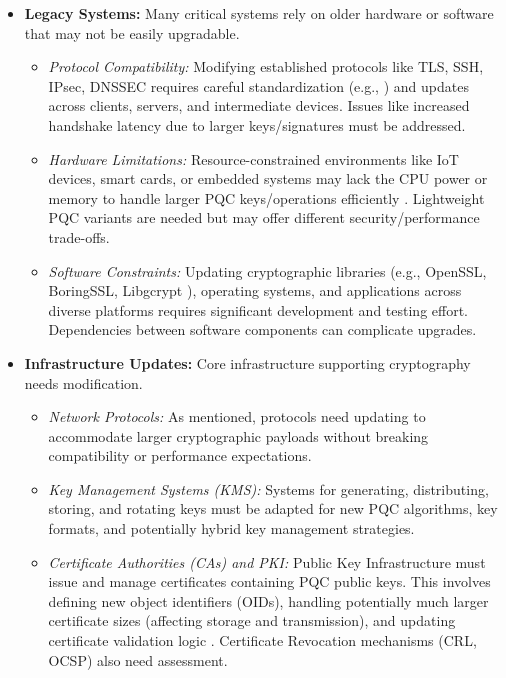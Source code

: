 \begin{itemize}
    \item \textbf{Legacy Systems:} Many critical systems rely on older hardware or software that may not be easily upgradable.
    \begin{itemize}
        \item \textit{Protocol Compatibility:} Modifying established protocols like TLS, SSH, IPsec, DNSSEC requires careful standardization (e.g., \parencite{pqc_tls_integration_rfc}) and updates across clients, servers, and intermediate devices. Issues like increased handshake latency due to larger keys/signatures must be addressed.
        \item \textit{Hardware Limitations:} Resource-constrained environments like IoT devices, smart cards, or embedded systems may lack the CPU power or memory to handle larger PQC keys/operations efficiently \parencite{nistir8240_iot_pqc}. Lightweight PQC variants are needed but may offer different security/performance trade-offs.
        \item \textit{Software Constraints:} Updating cryptographic libraries (e.g., OpenSSL, BoringSSL, Libgcrypt \parencite{openssl_pqc_integration}), operating systems, and applications across diverse platforms requires significant development and testing effort. Dependencies between software components can complicate upgrades.
    \end{itemize}
    \item \textbf{Infrastructure Updates:} Core infrastructure supporting cryptography needs modification.
    \begin{itemize}
        \item \textit{Network Protocols:} As mentioned, protocols need updating to accommodate larger cryptographic payloads without breaking compatibility or performance expectations.
        \item \textit{Key Management Systems (KMS):} Systems for generating, distributing, storing, and rotating keys must be adapted for new PQC algorithms, key formats, and potentially hybrid key management strategies.
        \item \textit{Certificate Authorities (CAs) and PKI:} Public Key Infrastructure must issue and manage certificates containing PQC public keys. This involves defining new object identifiers (OIDs), handling potentially much larger certificate sizes (affecting storage and transmission), and updating certificate validation logic \parencite{pqc_pki_challenges}. Certificate Revocation mechanisms (CRL, OCSP) also need assessment.
    \end{itemize}
\end{itemize}

